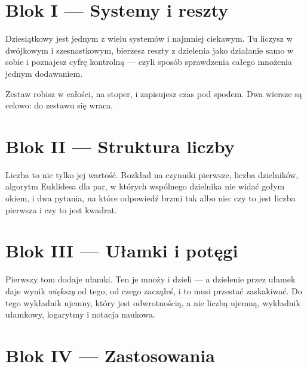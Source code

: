 %

\chapter{Blok I — Systemy i reszty}

Dziesiątkowy jest jednym z wielu systemów i najmniej ciekawym. Tu liczysz
w dwójkowym i szesnastkowym, bierzesz reszty z dzielenia jako działanie samo
w sobie i poznajesz cyfrę kontrolną — czyli sposób sprawdzenia całego mnożenia
jednym dodawaniem.

Zestaw robisz w całości, na stoper, i zapisujesz czas pod spodem. Dwa wiersze
są celowo: do zestawu się wraca.



\chapter{Blok II — Struktura liczby}

Liczba to nie tylko jej wartość. Rozkład na czynniki pierwsze, liczba
dzielników, algorytm Euklidesa dla par, w których wspólnego dzielnika nie widać
gołym okiem, i dwa pytania, na które odpowiedź brzmi tak albo nie: czy to jest
liczba pierwsza i czy to jest kwadrat.



\chapter{Blok III — Ułamki i potęgi}

Pierwszy tom dodaje ułamki. Ten je mnoży i dzieli — a dzielenie przez ułamek
daje wynik \emph{większy} od tego, od czego zacząłeś, i to musi przestać
zaskakiwać. Do tego wykładnik ujemny, który jest odwrotnością, a nie liczbą
ujemną, wykładnik ułamkowy, logarytmy i notacja naukowa.



\chapter{Blok IV — Zastosowania}

